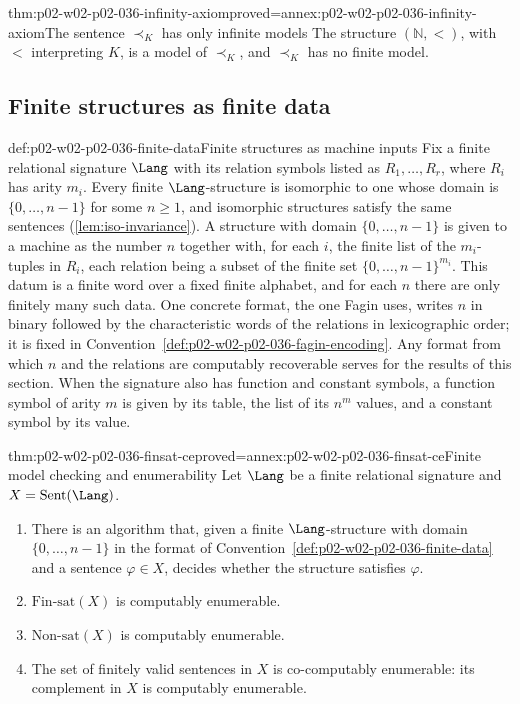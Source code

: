 \begin{hblemma}{thm:p02-w02-p02-036-infinity-axiom}{proved=annex:p02-w02-p02-036-infinity-axiom}{The sentence \(\prec_K\) has only infinite models}
The structure \((\mathbb N,<)\), with \(<\) interpreting \(K\), is a model of
\(\prec_K\), and \(\prec_K\) has no finite model.
\end{hblemma}

\subsection{Finite structures as finite data}
\label{sec:p02-w02-p02-036-finite-data}

\begin{hbconvention}{def:p02-w02-p02-036-finite-data}{Finite structures as machine inputs}
Fix a finite relational signature \(\Lang\) with its relation symbols listed
as \(R_1,\ldots,R_r\), where \(R_i\) has arity \(m_i\).  Every finite
\(\Lang\)-structure is isomorphic to one whose domain is
\(\{0,\ldots,n-1\}\) for some \(n\geq1\), and isomorphic structures satisfy
the same sentences (\cref{lem:iso-invariance}).  A structure with domain
\(\{0,\ldots,n-1\}\) is given to a machine as the number \(n\) together with,
for each \(i\), the finite list of the \(m_i\)-tuples in \(R_i\), each relation
being a subset of the finite set \(\{0,\ldots,n-1\}^{m_i}\).  This datum is a
finite word over a fixed finite alphabet, and for each \(n\) there are only
finitely many such data.  One concrete format, the one Fagin uses, writes \(n\)
in binary followed by the characteristic words of the relations in
lexicographic order; it is fixed in
Convention~\ref{def:p02-w02-p02-036-fagin-encoding}.  Any format from which
\(n\) and the relations are computably recoverable serves for the results of
this section.  When the signature also has function and constant symbols, a
function symbol of arity \(m\) is given by its table, the list of its \(n^m\)
values, and a constant symbol by its value.
\end{hbconvention}

\begin{hblemma}{thm:p02-w02-p02-036-finsat-ce}{proved=annex:p02-w02-p02-036-finsat-ce}{Finite model checking and enumerability}
Let \(\Lang\) be a finite relational signature and \(X=\operatorname{Sent}(\Lang)\).
\begin{enumerate}
\item There is an algorithm that, given a finite \(\Lang\)-structure with domain
      \(\{0,\ldots,n-1\}\) in the format of
      Convention~\ref{def:p02-w02-p02-036-finite-data} and a sentence
      \(\varphi\in X\), decides whether the structure satisfies \(\varphi\).
\item \(\mathrm{Fin\text{-}sat}(X)\) is computably enumerable.
\item \(\mathrm{Non\text{-}sat}(X)\) is computably enumerable.
\item The set of finitely valid sentences in \(X\) is co-computably enumerable:
      its complement in \(X\) is computably enumerable.
\end{enumerate}
\end{hblemma}

